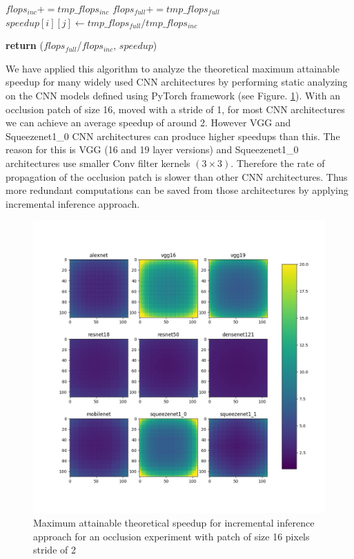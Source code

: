 \documentclass[10, sigconf]{acmart}
\begin{document}
\begin{algorithm}
\begin{algorithmic}[1]
      \State $flops_{inc} \mathrel{{+}{=}} tmp\_flops_{inc}$
      \State $flops_{full} \mathrel{{+}{=}} tmp\_flops_{full}$
      \State $speedup[i][j] \gets tmp\_flops_{full}/tmp\_flops_{inc}$
      
  \EndFor
\EndFor

\State \textbf{return} ($flops_{full}$/$flops_{inc}$, $speedup$)
\EndProcedure
\end{algorithmic}
\end{algorithm}

We have applied this algorithm to analyze the theoretical maximum attainable speedup for many widely used CNN architectures by performing static analyzing on the CNN models defined using PyTorch framework (see Figure. \ref{fig:speedups}).
With an occlusion patch of size 16, moved with a stride of 1, for most CNN architectures we can achieve an average speedup of around 2.
However VGG and Squeezenet1\_0 CNN architectures can produce higher speedups than this.
The reason for this is VGG (16 and 19 layer versions) and Squeezenet1\_0 architectures use smaller Conv filter kernels $(3\times3)$. Therefore the rate of propagation of the occlusion patch is slower than other CNN architectures.
Thus more redundant computations can be saved from those architectures by applying incremental inference approach.

\begin{figure}
  \includegraphics[width=\columnwidth]{./images/speedup_plots}
  \caption{Maximum attainable theoretical speedup for incremental inference approach for an occlusion experiment with patch of size 16 pixels stride of 2}
  \label{fig:speedups}
\end{figure}
\end{document}
